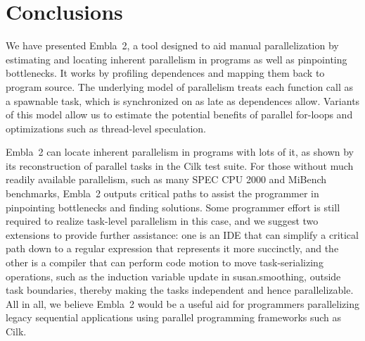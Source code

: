 \section{Conclusions}

We have presented Embla~2, a tool designed to aid manual parallelization by estimating and locating inherent parallelism in programs as well as pinpointing bottlenecks.
It works by profiling dependences and mapping them back to program source.
The underlying model of parallelism treats each function call as a spawnable task, which is synchronized on as late as dependences allow.
Variants of this model allow us to estimate the potential benefits of parallel for-loops and optimizations such as thread-level speculation.

Embla~2 can locate inherent parallelism in programs with lots of it,
as shown by its reconstruction of parallel tasks in the Cilk test suite.
For those without much readily available parallelism,
such as many SPEC CPU 2000 and MiBench benchmarks,
Embla~2 outputs critical paths to assist the programmer in pinpointing bottlenecks and finding solutions.
Some programmer effort is still required to realize task-level parallelism in this case,
and we suggest two extensions to provide further assistance:
one is an IDE that can simplify a critical path down to a regular expression that represents it more succinctly,
and the other is a compiler that can perform code motion to move task-serializing operations,
such as the induction variable update in \textsf{susan.smoothing}, outside task boundaries,
thereby making the tasks independent and hence parallelizable.
All in all, we believe Embla~2 would be a useful aid for programmers parallelizing legacy sequential applications using parallel programming frameworks such as Cilk.
